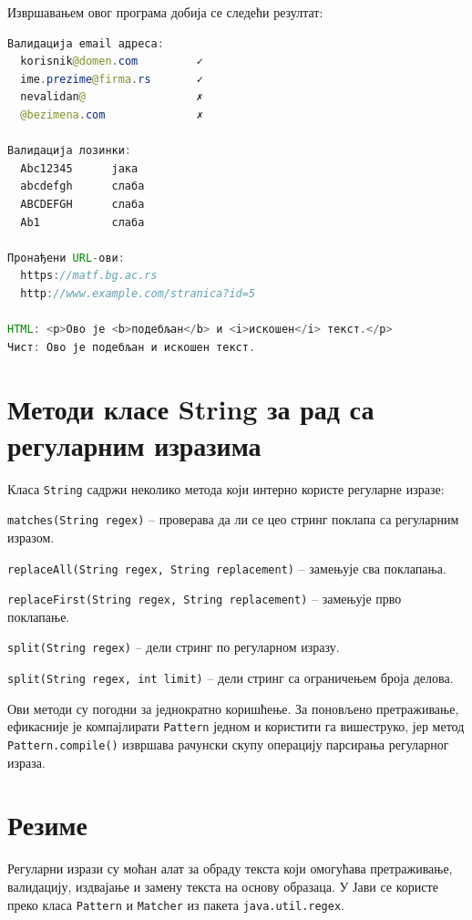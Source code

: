 Извршавањем овог програма добија се следећи резултат:


\begin{lstlisting}[language=Java]
Валидација email адреса:
  korisnik@domen.com         ✓
  ime.prezime@firma.rs       ✓
  nevalidan@                 ✗
  @bezimena.com              ✗
 
Валидација лозинки:
  Abc12345      јака
  abcdefgh      слаба
  ABCDEFGH      слаба
  Ab1           слаба
 
Пронађени URL-ови:
  https://matf.bg.ac.rs
  http://www.example.com/stranica?id=5
 
HTML: <p>Ово је <b>подебљан</b> и <i>искошен</i> текст.</p>
Чист: Ово је подебљан и искошен текст.
\end{lstlisting}


\section{Методи класе String за рад са регуларним изразима}

Класа \texttt{String} садржи неколико метода који интерно користе регуларне изразе:

\texttt{matches(String regex)} – проверава да ли се цео стринг поклапа са регуларним изразом.

\texttt{replaceAll(String regex, String replacement)} – замењује сва поклапања.

\texttt{replaceFirst(String regex, String replacement)} – замењује прво поклапање.

\texttt{split(String regex)} – дели стринг по регуларном изразу.

\texttt{split(String regex, int limit)} – дели стринг са ограничењем броја делова.

Ови методи су погодни за једнократно коришћење. За поновљено претраживање, ефикасније је компајлирати \texttt{Pattern} једном и користити га вишеструко, јер метод \texttt{Pattern.compile()} извршава рачунски скупу операцију парсирања регуларног израза.


\section{Резиме}

Регуларни изрази су моћан алат за обраду текста који омогућава претраживање, валидацију, издвајање и замену текста на основу образаца. У Јави се користе преко класа \texttt{Pattern} и \texttt{Matcher} из пакета \texttt{java.util.regex}.

